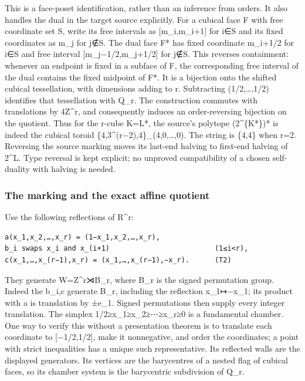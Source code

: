 \documentclass[
  10pt,
  letterpaper,
]{article}
\begin{document}
This is a face-poset identification, rather than an inference from
orders. It also handles the dual in the target source explicitly. For a
cubical face F with free coordinate set S, write its free intervals as
{[}m\_i,m\_i+1{]} for i∈S and its fixed coordinates as m\_j for j∉S. The
dual face F* has fixed coordinate m\_i+1/2 for i∈S and free interval
{[}m\_j−1/2,m\_j+1/2{]} for j∉S. This reverses containment: whenever an
endpoint is fixed in a subface of F, the corresponding free interval of
the dual contains the fixed midpoint of F*. It is a bijection onto the
shifted cubical tessellation, with dimensions adding to r. Subtracting
(1/2,\ldots,1/2) identifies that tessellation with Q\_r. The
construction commutes with translations by 4Z\^{}r, and consequently
induces an order-reversing bijection on the quotient. Thus for the
r-cube K=L*, the source's polytope (2\^{}\{K*\})* is indeed the cubical
toroid \{4,3\^{}(r−2),4\}\_(4,0,\ldots,0). The string is \{4,4\} when
r=2. Reversing the source marking moves its last-end halving to
first-end halving of 2\^{}L. Type reversal is kept explicit; no unproved
compatibility of a chosen self-duality with halving is needed.

\subsubsection{The marking and the exact affine
quotient}\label{the-marking-and-the-exact-affine-quotient}

Use the following reflections of R\^{}r:

\begin{verbatim}
a(x_1,x_2,…,x_r) = (1−x_1,x_2,…,x_r),
b_i swaps x_i and x_(i+1)                         (1≤i<r),
c(x_1,…,x_(r−1),x_r) = (x_1,…,x_(r−1),−x_r).      (T2)
\end{verbatim}

They generate W=Z\^{}r⋊B\_r, where B\_r is the signed permutation group.
Indeed the b\_i,c generate B\_r, including the reflection x\_1↦−x\_1;
its product with a is translation by ±e\_1. Signed permutations then
supply every integer translation. The simplex 1/2≥x\_1≥x\_2≥⋯≥x\_r≥0 is
a fundamental chamber. One way to verify this without a presentation
theorem is to translate each coordinate to {[}−1/2,1/2{]}, make it
nonnegative, and order the coordinates; a point with strict inequalities
has a unique such representative. Its reflected walls are the displayed
generators. Its vertices are the barycentres of a nested flag of cubical
faces, so its chamber system is the barycentric subdivision of Q\_r.
\end{document}

